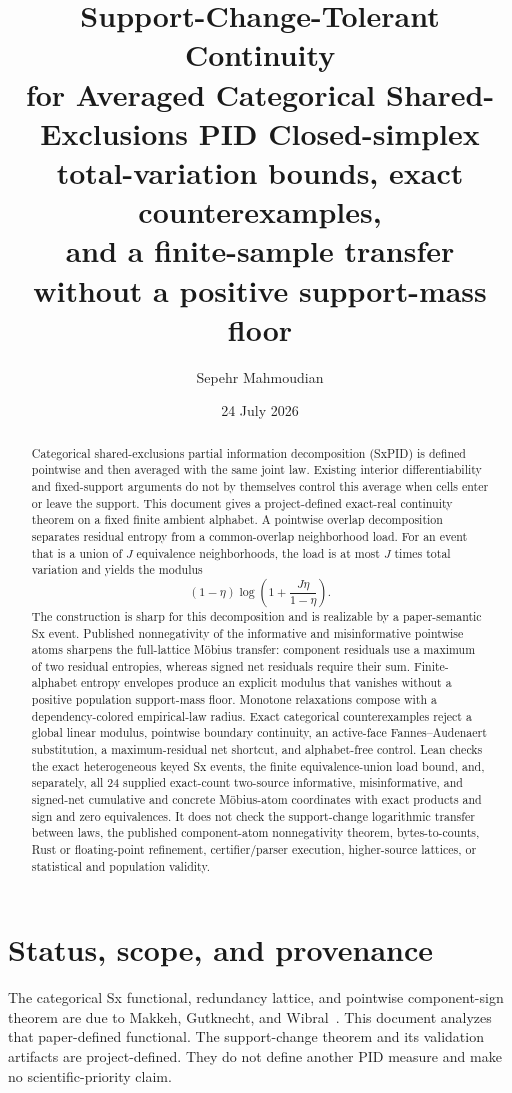 \documentclass[11pt]{article}
\title{\PidReportTitle
  {Support-Change-Tolerant Continuity\\
   for Averaged Categorical Shared-Exclusions PID}
  {Closed-simplex total-variation bounds, exact counterexamples,\\
   and a finite-sample transfer without a positive support-mass floor}}
\author{Sepehr Mahmoudian}
\date{24 July 2026}
\theoremstyle{definition}
\begin{document}
\PidMakeTitle

\begin{abstract}
Categorical shared-exclusions partial information decomposition (SxPID) is defined pointwise and
then averaged with the same joint law.  Existing interior differentiability and fixed-support
arguments do not by themselves control this average when cells enter or leave the support.
This document gives a project-defined exact-real continuity theorem on a fixed finite ambient
alphabet.  A pointwise overlap decomposition separates residual entropy from a common-overlap
neighborhood load.  For an event that is a union of \(J\) equivalence neighborhoods, the load is at
most \(J\) times total variation and yields the modulus
\[
  (1-\eta)\log\!\left(1+\frac{J\eta}{1-\eta}\right).
\]
The construction is sharp for this decomposition and is realizable by a paper-semantic Sx event.
Published nonnegativity of the informative and misinformative pointwise atoms sharpens the
full-lattice M{\"o}bius transfer: component residuals use a maximum of two residual entropies,
whereas signed net residuals require their sum.  Finite-alphabet entropy envelopes produce an
explicit modulus that vanishes without a positive population support-mass floor.  Monotone
relaxations compose with a dependency-colored empirical-law radius.  Exact categorical
counterexamples reject a global linear modulus, pointwise boundary continuity, an active-face
Fannes--Audenaert substitution, a maximum-residual net shortcut, and alphabet-free control.
Lean checks the exact heterogeneous keyed Sx events, the finite equivalence-union load bound, and,
separately, all 24 supplied exact-count two-source informative, misinformative, and signed-net
cumulative and concrete M{\"o}bius-atom coordinates with exact products and sign and zero
equivalences.  It does not check the support-change logarithmic transfer between laws, the
published component-atom nonnegativity theorem, bytes-to-counts, Rust or floating-point
refinement, certifier/parser execution, higher-source lattices, or statistical and population
validity.
\end{abstract}

\begingroup
\small
\setlength{\parskip}{0pt}
\tableofcontents
\endgroup

\section{Status, scope, and provenance}

The categorical Sx functional, redundancy lattice, and pointwise component-sign theorem are due to
Makkeh, Gutknecht, and Wibral~\cite{makkeh2021,gutknecht2021}.  This document analyzes that
paper-defined functional.  The support-change theorem and its validation artifacts are
project-defined.  They do not define another PID measure and make no scientific-priority claim.
\end{document}
